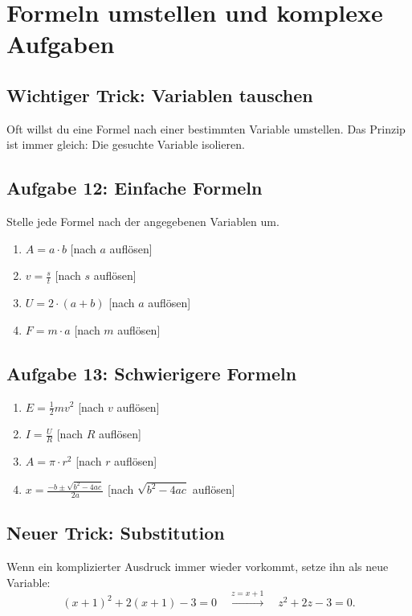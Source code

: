 \documentclass[12pt]{article}
\begin{document}
\section*{Formeln umstellen und komplexe Aufgaben}

\subsection*{Wichtiger Trick: Variablen tauschen}
Oft willst du eine Formel nach einer bestimmten Variable umstellen. Das Prinzip ist immer gleich: Die gesuchte Variable isolieren.

\subsection*{Aufgabe 12: Einfache Formeln}
Stelle jede Formel nach der angegebenen Variablen um.
\begin{enumerate}
  \item \(A = a \cdot b\) \hfill [nach \(a\) auflösen]
  \item \(v = \frac{s}{t}\) \hfill [nach \(s\) auflösen]
  \item \(U = 2 \cdot (a + b)\) \hfill [nach \(a\) auflösen]
  \item \(F = m \cdot a\) \hfill [nach \(m\) auflösen]
\end{enumerate}

\subsection*{Aufgabe 13: Schwierigere Formeln}
\begin{enumerate}
  \item \(E = \frac{1}{2} m v^2\) \hfill [nach \(v\) auflösen]
  \item \(I = \frac{U}{R}\) \hfill [nach \(R\) auflösen]
  \item \(A = \pi \cdot r^2\) \hfill [nach \(r\) auflösen]
  \item \(x = \frac{-b \pm \sqrt{b^2 - 4ac}}{2a}\) \hfill [nach \(\sqrt{b^2 - 4ac}\) auflösen]
\end{enumerate}

\subsection*{Neuer Trick: Substitution}
Wenn ein komplizierter Ausdruck immer wieder vorkommt, setze ihn als neue Variable:
\[
  (x + 1)^2 + 2(x + 1) - 3 = 0 \quad \xrightarrow{z = x + 1} \quad z^2 + 2z - 3 = 0.
\]
\end{document}
